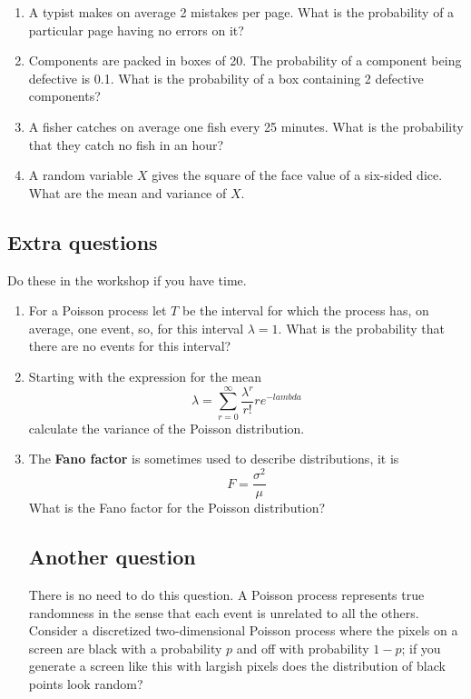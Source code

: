 \documentclass[11pt,a4paper]{scrartcl}
\begin{document}
\begin{enumerate}

  

\item A typist makes on average 2 mistakes per page. What is the probability of a particular page having no errors on it?

\item Components are packed in boxes of 20. The probability of a component being defective is 0.1. What is the probability of a box containing 2 defective components?
  
\item A fisher catches on average one fish every 25 minutes. What is
  the probability that they catch no fish in an hour?

 \item A random variable $X$ gives the square of the face value of a six-sided dice. What are the mean and variance of $X$.

\end{enumerate}

\subsection*{Extra questions}
Do these in the workshop if you have time.


\begin{enumerate}

\item For a Poisson process let $T$ be the interval for which the
process has, on average, one event, so, for this interval $\lambda=1$. What is the probability that there are no events for this interval?  

\item Starting with the expression for the mean
  \begin{equation}
    \lambda =\sum_{r=0}^\infty \frac{\lambda^r}{r!}re^{-lambda}
  \end{equation}
  calculate the variance of the Poisson distribution.
  
\item The \textbf{Fano factor} is sometimes used to describe distributions, it is
  \begin{equation}
    F=\frac{\sigma^2}{\mu}
  \end{equation}
What is the Fano factor for the Poisson distribution?

\subsection*{Another question}

There is no need to do this question. A Poisson process represents
true randomness in the sense that each event is unrelated to all the
others. Consider a discretized two-dimensional Poisson process where
the pixels on a screen are black with a probability $p$ and off with
probability $1-p$; if you generate a screen like this with largish
pixels does the distribution of black points look random?

\end{enumerate}
\end{document}
